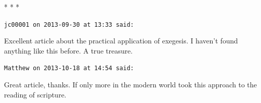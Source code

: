 
\begin{center}* * *\end{center}

\begin{footnotesize}\begin{sffamily}

\texttt{jc00001 on 2013-09-30 at 13:33 said: }

Excellent article about the practical application of exegesis. I haven’t found anything like this before. A true treasure.

\hfill

\texttt{Matthew on 2013-10-18 at 14:54 said: }

Great article, thanks. If only more in the modern world took this approach to the reading of scripture.

\hfill

\end{sffamily}\end{footnotesize}

